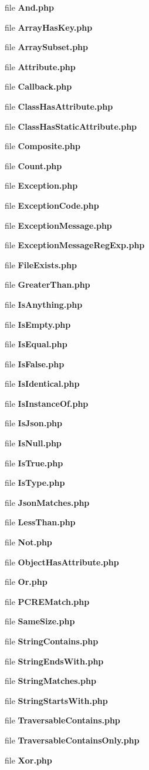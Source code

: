 \begin{DoxyCompactItemize}
\item 
file {\bf And.\+php}
\item 
file {\bf Array\+Has\+Key.\+php}
\item 
file {\bf Array\+Subset.\+php}
\item 
file {\bf Attribute.\+php}
\item 
file {\bf Callback.\+php}
\item 
file {\bf Class\+Has\+Attribute.\+php}
\item 
file {\bf Class\+Has\+Static\+Attribute.\+php}
\item 
file {\bf Composite.\+php}
\item 
file {\bf Count.\+php}
\item 
file {\bf Exception.\+php}
\item 
file {\bf Exception\+Code.\+php}
\item 
file {\bf Exception\+Message.\+php}
\item 
file {\bf Exception\+Message\+Reg\+Exp.\+php}
\item 
file {\bf File\+Exists.\+php}
\item 
file {\bf Greater\+Than.\+php}
\item 
file {\bf Is\+Anything.\+php}
\item 
file {\bf Is\+Empty.\+php}
\item 
file {\bf Is\+Equal.\+php}
\item 
file {\bf Is\+False.\+php}
\item 
file {\bf Is\+Identical.\+php}
\item 
file {\bf Is\+Instance\+Of.\+php}
\item 
file {\bf Is\+Json.\+php}
\item 
file {\bf Is\+Null.\+php}
\item 
file {\bf Is\+True.\+php}
\item 
file {\bf Is\+Type.\+php}
\item 
file {\bf Json\+Matches.\+php}
\item 
file {\bf Less\+Than.\+php}
\item 
file {\bf Not.\+php}
\item 
file {\bf Object\+Has\+Attribute.\+php}
\item 
file {\bf Or.\+php}
\item 
file {\bf P\+C\+R\+E\+Match.\+php}
\item 
file {\bf Same\+Size.\+php}
\item 
file {\bf String\+Contains.\+php}
\item 
file {\bf String\+Ends\+With.\+php}
\item 
file {\bf String\+Matches.\+php}
\item 
file {\bf String\+Starts\+With.\+php}
\item 
file {\bf Traversable\+Contains.\+php}
\item 
file {\bf Traversable\+Contains\+Only.\+php}
\item 
file {\bf Xor.\+php}
\end{DoxyCompactItemize}
